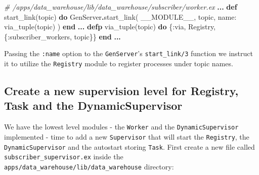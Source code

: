 \documentclass[
  oneside]{book}
\newenvironment{Shaded}{\begin{snugshade}}{\end{snugshade}}
\newcommand{\CommentTok}[1]{\textcolor[rgb]{0.56,0.35,0.01}{\textit{#1}}}
\newcommand{\ConstantTok}[1]{\textcolor[rgb]{0.00,0.00,0.00}{#1}}
\newcommand{\KeywordTok}[1]{\textcolor[rgb]{0.13,0.29,0.53}{\textbf{#1}}}
\newcommand{\NormalTok}[1]{#1}
\newcommand{\OperatorTok}[1]{\textcolor[rgb]{0.81,0.36,0.00}{\textbf{#1}}}
\newcommand{\VariableTok}[1]{\textcolor[rgb]{0.00,0.00,0.00}{#1}}
\begin{document}
\begin{Shaded}
\begin{Highlighting}[]
  \CommentTok{\# /apps/data\_warehouse/lib/data\_warehouse/subscriber/worker.ex}
  \OperatorTok{...}
  \KeywordTok{def}\NormalTok{ start\_link(topic) }\KeywordTok{do}
    \ConstantTok{GenServer}\OperatorTok{.}\NormalTok{start\_link(}
      \ConstantTok{\_\_MODULE\_\_}\NormalTok{,}
\NormalTok{      topic,}
      \VariableTok{name:}\NormalTok{ via\_tuple(topic)}
\NormalTok{    )}
  \KeywordTok{end}
  \OperatorTok{...}
  \KeywordTok{defp}\NormalTok{ via\_tuple(topic) }\KeywordTok{do}
\NormalTok{    \{}\VariableTok{:via}\NormalTok{, }\ConstantTok{Registry}\NormalTok{, \{}\VariableTok{:subscriber\_workers}\NormalTok{, topic\}\}}
  \KeywordTok{end}
  \OperatorTok{...}    
\end{Highlighting}
\end{Shaded}

Passing the \texttt{:name} option to the \texttt{GenServer}'s \texttt{start\_link/3} function we instruct it to utilize the \texttt{Registry} module to register processes under topic names.

\hypertarget{create-a-new-supervision-level-for-registry-task-and-the-dynamicsupervisor}{%
\subsection{Create a new supervision level for Registry, Task and the DynamicSupervisor}\label{create-a-new-supervision-level-for-registry-task-and-the-dynamicsupervisor}}

We have the lowest level modules - the \texttt{Worker} and the \texttt{DynamicSupervisor} implemented - time to add a new \texttt{Supervisor} that will start the \texttt{Registry}, the \texttt{DynamicSupervisor} and the autostart storing \texttt{Task}. First create a new file called \texttt{subscriber\_supervisor.ex} inside the \texttt{apps/data\_warehouse/lib/data\_warehouse} directory:
\end{document}
